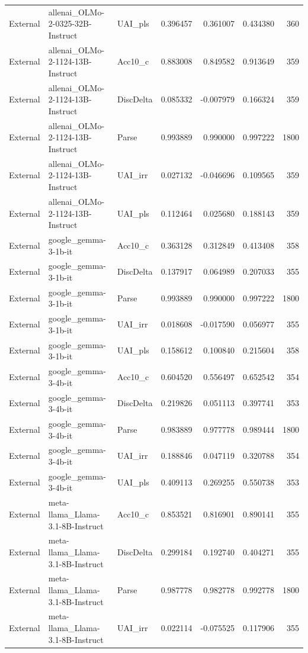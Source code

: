 \begin{tabular}{lllrrrr}
External & allenai_OLMo-2-0325-32B-Instruct & UAI_pls & 0.396457 & 0.361007 & 0.434380 & 360 \\
External & allenai_OLMo-2-1124-13B-Instruct & Acc10_c & 0.883008 & 0.849582 & 0.913649 & 359 \\
External & allenai_OLMo-2-1124-13B-Instruct & DiscDelta & 0.085332 & -0.007979 & 0.166324 & 359 \\
External & allenai_OLMo-2-1124-13B-Instruct & Parse & 0.993889 & 0.990000 & 0.997222 & 1800 \\
External & allenai_OLMo-2-1124-13B-Instruct & UAI_irr & 0.027132 & -0.046696 & 0.109565 & 359 \\
External & allenai_OLMo-2-1124-13B-Instruct & UAI_pls & 0.112464 & 0.025680 & 0.188143 & 359 \\
External & google_gemma-3-1b-it & Acc10_c & 0.363128 & 0.312849 & 0.413408 & 358 \\
External & google_gemma-3-1b-it & DiscDelta & 0.137917 & 0.064989 & 0.207033 & 355 \\
External & google_gemma-3-1b-it & Parse & 0.993889 & 0.990000 & 0.997222 & 1800 \\
External & google_gemma-3-1b-it & UAI_irr & 0.018608 & -0.017590 & 0.056977 & 355 \\
External & google_gemma-3-1b-it & UAI_pls & 0.158612 & 0.100840 & 0.215604 & 358 \\
External & google_gemma-3-4b-it & Acc10_c & 0.604520 & 0.556497 & 0.652542 & 354 \\
External & google_gemma-3-4b-it & DiscDelta & 0.219826 & 0.051113 & 0.397741 & 353 \\
External & google_gemma-3-4b-it & Parse & 0.983889 & 0.977778 & 0.989444 & 1800 \\
External & google_gemma-3-4b-it & UAI_irr & 0.188846 & 0.047119 & 0.320788 & 354 \\
External & google_gemma-3-4b-it & UAI_pls & 0.409113 & 0.269255 & 0.550738 & 353 \\
External & meta-llama_Llama-3.1-8B-Instruct & Acc10_c & 0.853521 & 0.816901 & 0.890141 & 355 \\
External & meta-llama_Llama-3.1-8B-Instruct & DiscDelta & 0.299184 & 0.192740 & 0.404271 & 355 \\
External & meta-llama_Llama-3.1-8B-Instruct & Parse & 0.987778 & 0.982778 & 0.992778 & 1800 \\
External & meta-llama_Llama-3.1-8B-Instruct & UAI_irr & 0.022114 & -0.075525 & 0.117906 & 355 \\

\end{tabular}
